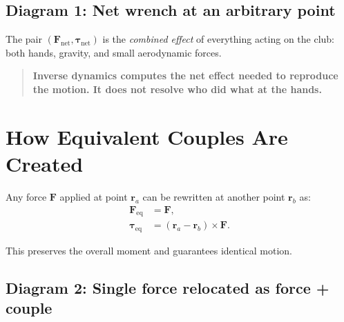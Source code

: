 \documentclass[12pt]{article}
\begin{document}
\subsection*{Diagram 1: Net wrench at an arbitrary point}

\begin{center}
\end{center}

The pair $(\mathbf{F}_{\mathrm{net}},\bm{\tau}_{\mathrm{net}})$ is the \emph{combined effect} of everything acting on the club: both hands, gravity, and small aerodynamic forces.

\begin{quote}
\textbf{Inverse dynamics computes the net effect needed to reproduce the motion.  
It does not resolve who did what at the hands.}
\end{quote}

\section{How Equivalent Couples Are Created}

Any force $\mathbf{F}$ applied at point $\mathbf{r}_a$ can be rewritten at another point $\mathbf{r}_b$ as:
\begin{align}
    \mathbf{F}_{\mathrm{eq}} &= \mathbf{F},\\
    \bm{\tau}_{\mathrm{eq}} &= (\mathbf{r}_a - \mathbf{r}_b)\times \mathbf{F}.
\end{align}

This preserves the overall moment and guarantees identical motion.

\subsection*{Diagram 2: Single force relocated as force + couple}
\end{document}
